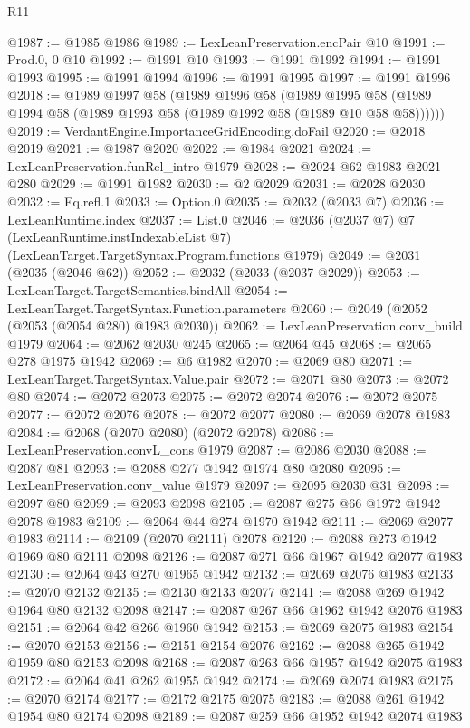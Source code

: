 \begin{lexlean}{R11}
\begin{coremodule}
@1987 := @1985 @1986
@1989 := LexLeanPreservation.encPair @10
@1991 := Prod.{0, 0} @10
@1992 := @1991 @10
@1993 := @1991 @1992
@1994 := @1991 @1993
@1995 := @1991 @1994
@1996 := @1991 @1995
@1997 := @1991 @1996
@2018 := @1989
    @1997
    @58
    (@1989
      @1996
      @58
      (@1989 @1995 @58 (@1989 @1994 @58 (@1989 @1993 @58 (@1989 @1992 @58 (@1989 @10 @58 @58))))))
@2019 := VerdantEngine.ImportanceGridEncoding.doFail
@2020 := @2018 @2019
@2021 := @1987 @2020
@2022 := @1984 @2021
@2024 := LexLeanPreservation.funRel_intro @1979
@2028 := @2024 @62 @1983 @2021 @280
@2029 := @1991 @1982
@2030 := @2 @2029
@2031 := @2028 @2030
@2032 := Eq.refl.{1}
@2033 := Option.{0}
@2035 := @2032 (@2033 @7)
@2036 := LexLeanRuntime.index
@2037 := List.{0}
@2046 := @2036
    (@2037 @7)
    @7
    (LexLeanRuntime.instIndexableList @7)
    (LexLeanTarget.TargetSyntax.Program.functions @1979)
@2049 := @2031 (@2035 (@2046 @62))
@2052 := @2032 (@2033 (@2037 @2029))
@2053 := LexLeanTarget.TargetSemantics.bindAll
@2054 := LexLeanTarget.TargetSyntax.Function.parameters
@2060 := @2049 (@2052 (@2053 (@2054 @280) @1983 @2030))
@2062 := LexLeanPreservation.conv_build @1979
@2064 := @2062 @2030 @245
@2065 := @2064 @45
@2068 := @2065 @278 @1975 @1942
@2069 := @6 @1982
@2070 := @2069 @80
@2071 := LexLeanTarget.TargetSyntax.Value.pair
@2072 := @2071 @80
@2073 := @2072 @80
@2074 := @2072 @2073
@2075 := @2072 @2074
@2076 := @2072 @2075
@2077 := @2072 @2076
@2078 := @2072 @2077
@2080 := @2069 @2078 @1983
@2084 := @2068 (@2070 @2080) (@2072 @2078)
@2086 := LexLeanPreservation.convL_cons @1979
@2087 := @2086 @2030
@2088 := @2087 @81
@2093 := @2088 @277 @1942 @1974 @80 @2080
@2095 := LexLeanPreservation.conv_value @1979
@2097 := @2095 @2030 @31
@2098 := @2097 @80
@2099 := @2093 @2098
@2105 := @2087 @275 @66 @1972 @1942 @2078 @1983
@2109 := @2064 @44 @274 @1970 @1942
@2111 := @2069 @2077 @1983
@2114 := @2109 (@2070 @2111) @2078
@2120 := @2088 @273 @1942 @1969 @80 @2111 @2098
@2126 := @2087 @271 @66 @1967 @1942 @2077 @1983
@2130 := @2064 @43 @270 @1965 @1942
@2132 := @2069 @2076 @1983
@2133 := @2070 @2132
@2135 := @2130 @2133 @2077
@2141 := @2088 @269 @1942 @1964 @80 @2132 @2098
@2147 := @2087 @267 @66 @1962 @1942 @2076 @1983
@2151 := @2064 @42 @266 @1960 @1942
@2153 := @2069 @2075 @1983
@2154 := @2070 @2153
@2156 := @2151 @2154 @2076
@2162 := @2088 @265 @1942 @1959 @80 @2153 @2098
@2168 := @2087 @263 @66 @1957 @1942 @2075 @1983
@2172 := @2064 @41 @262 @1955 @1942
@2174 := @2069 @2074 @1983
@2175 := @2070 @2174
@2177 := @2172 @2175 @2075
@2183 := @2088 @261 @1942 @1954 @80 @2174 @2098
@2189 := @2087 @259 @66 @1952 @1942 @2074 @1983

\end{coremodule}
\end{lexlean}
